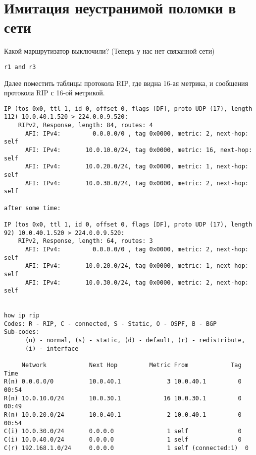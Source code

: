 \documentclass[a4paper,12pt]{article}
\begin{document}
\section{Имитация неустранимой поломки в сети}

Какой маршрутизатор выключили? (Теперь у нас нет связанной сети)

\begin{Verbatim}
r1 and r3
\end{Verbatim}

Далее поместить таблицы протокола RIP, где видна 16-ая метрика, и сообщения протокола RIP с 16-ой метрикой.
\begin{Verbatim}
IP (tos 0x0, ttl 1, id 0, offset 0, flags [DF], proto UDP (17), length 112) 10.0.40.1.520 > 224.0.0.9.520: 
	RIPv2, Response, length: 84, routes: 4
	  AFI: IPv4:         0.0.0.0/0 , tag 0x0000, metric: 2, next-hop: self
	  AFI: IPv4:       10.0.10.0/24, tag 0x0000, metric: 16, next-hop: self
	  AFI: IPv4:       10.0.20.0/24, tag 0x0000, metric: 1, next-hop: self
	  AFI: IPv4:       10.0.30.0/24, tag 0x0000, metric: 2, next-hop: self

after some time:

IP (tos 0x0, ttl 1, id 0, offset 0, flags [DF], proto UDP (17), length 92) 10.0.40.1.520 > 224.0.0.9.520: 
	RIPv2, Response, length: 64, routes: 3
	  AFI: IPv4:         0.0.0.0/0 , tag 0x0000, metric: 2, next-hop: self
	  AFI: IPv4:       10.0.20.0/24, tag 0x0000, metric: 1, next-hop: self
	  AFI: IPv4:       10.0.30.0/24, tag 0x0000, metric: 2, next-hop: self


how ip rip
Codes: R - RIP, C - connected, S - Static, O - OSPF, B - BGP
Sub-codes:
      (n) - normal, (s) - static, (d) - default, (r) - redistribute,
      (i) - interface

     Network            Next Hop         Metric From            Tag Time
R(n) 0.0.0.0/0          10.0.40.1             3 10.0.40.1         0 00:54
R(n) 10.0.10.0/24       10.0.30.1            16 10.0.30.1         0 00:49
R(n) 10.0.20.0/24       10.0.40.1             2 10.0.40.1         0 00:54
C(i) 10.0.30.0/24       0.0.0.0               1 self              0
C(i) 10.0.40.0/24       0.0.0.0               1 self              0
C(r) 192.168.1.0/24     0.0.0.0               1 self (connected:1)  0
\end{Verbatim}
\end{document}
